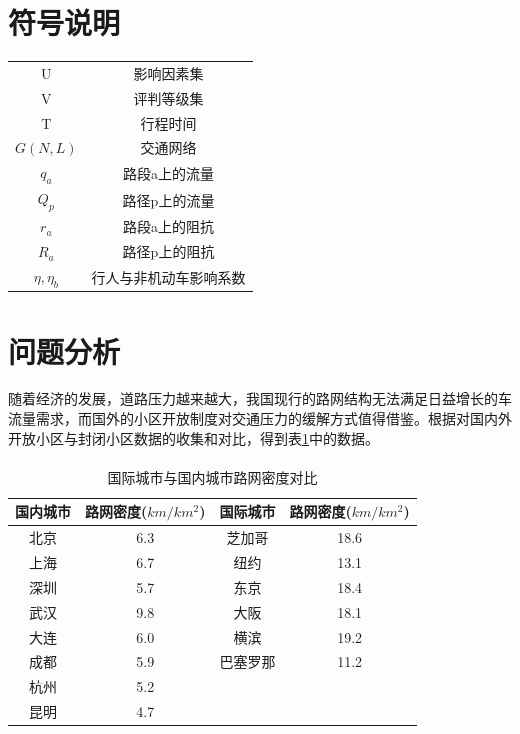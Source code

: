 \documentclass[fontset=windows,a4paper,12pt]{ctexart}
\newcommand{\upcite}[1]{\textsuperscript{\textsuperscript{\cite{#1}}}}
\begin{document}
  \section{符号说明}
  \begin{tabular}{c|c}
	\toprule[1pt]
	\makebox[0.4\textwidth][c]{符号}	&  \makebox[0.5\textwidth][c]{意义} \\ \hline
	U				&	影响因素集\\
	V				&	评判等级集\\
	T				&	行程时间\\
	$G(N,L)$		&	交通网络\\
	$q_a$			&	路段a上的流量\\
	$Q_p$			&	路径p上的流量\\
	$r_a$			&	路段a上的阻抗\\
	$R_a$			&	路径p上的阻抗\\
	$\eta,\eta_b$	&	行人与非机动车影响系数\\
	\bottomrule[1pt]
\end{tabular}

  \section{问题分析}
  随着经济的发展，道路压力越来越大，我国现行的路网结构无法满足日益增长的车流量需求，而国外的小区开放制度对交通压力的缓解方式值得借鉴。根据对国内外开放小区与封闭小区数据的收集和对比，得到表\ref{tab:net_density}中的数据。
  \begin{table}[!htbp]
	\centering
	\caption{国际城市与国内城市路网密度对比\upcite{国外街区制是如何完美炼成}}
	\label{tab:net_density}
	\begin{tabular}{cc|cc}
		\toprule[1pt]
		国内城市 & 路网密度($km/km^2$) & 国际城市 & 路网密度($km/km^2$) \\ 
		\hline%
		北京 & 6.3 & 芝加哥 & 18.6 \\ 
		上海 & 6.7 & 纽约 & 13.1 \\ 
		深圳 & 5.7 & 东京 & 18.4 \\ 
		武汉 & 9.8 & 大阪 & 18.1 \\ 
		大连 & 6.0 & 横滨 & 19.2 \\ 
		成都 & 5.9 & 巴塞罗那 & 11.2 \\ 
		杭州 & 5.2 &  &  \\ 
		昆明 & 4.7 &  &  \\ 
		\bottomrule[1pt]
	\end{tabular} 
  \end{table}
  
\end{document}
